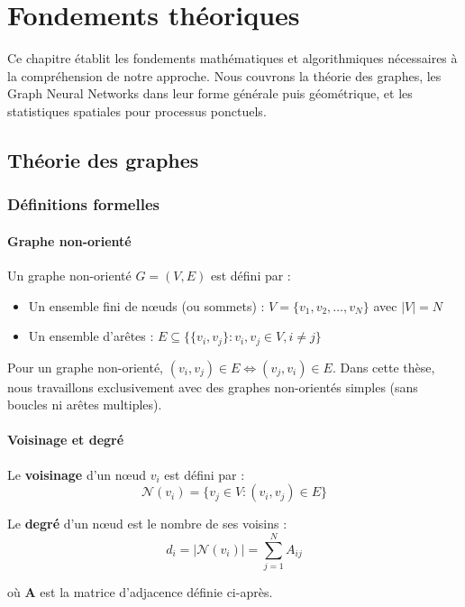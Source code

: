 
\chapter{Fondements théoriques}

Ce chapitre établit les fondements mathématiques et algorithmiques nécessaires à la compréhension de notre approche. Nous couvrons la théorie des graphes, les Graph Neural Networks dans leur forme générale puis géométrique, et les statistiques spatiales pour processus ponctuels.

\section{Théorie des graphes}

\subsection{Définitions formelles}

\subsubsection{Graphe non-orienté}

Un graphe non-orienté $G = (V, E)$ est défini par :
\begin{itemize}
    \item Un ensemble fini de nœuds (ou sommets) : $V = \{v_1, v_2, \ldots, v_N\}$ avec $|V| = N$
    \item Un ensemble d'arêtes : $E \subseteq \{\{v_i, v_j\} : v_i, v_j \in V, i \neq j\}$
\end{itemize}

Pour un graphe non-orienté, $(v_i, v_j) \in E \Leftrightarrow (v_j, v_i) \in E$. Dans cette thèse, nous travaillons exclusivement avec des graphes non-orientés simples (sans boucles ni arêtes multiples).

\subsubsection{Voisinage et degré}

Le \textbf{voisinage} d'un nœud $v_i$ est défini par :
\[
\mathcal{N}(v_i) = \{v_j \in V : (v_i, v_j) \in E\}
\]

Le \textbf{degré} d'un nœud est le nombre de ses voisins :
\[
d_i = |\mathcal{N}(v_i)| = \sum_{j=1}^N A_{ij}
\]

où $\mathbf{A}$ est la matrice d'adjacence définie ci-après.

